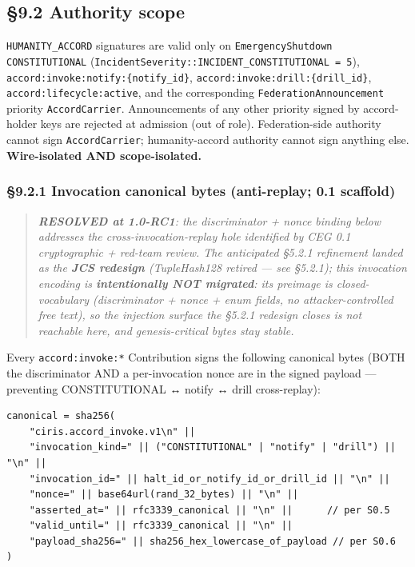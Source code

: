 \documentclass[11pt]{article}
\begin{document}
\subsection*{§9.2 Authority scope}


\texttt{HUMANITY\_ACCORD} signatures are valid only on \texttt{EmergencyShutdown CONSTITUTIONAL} (\texttt{IncidentSeverity::INCIDENT\_CONSTITUTIONAL = 5}), \texttt{accord:invoke:notify:\{notify\_id\}}, \texttt{accord:invoke:drill:\{drill\_id\}}, \texttt{accord:lifecycle:active}, and the corresponding \texttt{FederationAnnouncement} priority \texttt{AccordCarrier}. Announcements of any other priority signed by accord-holder keys are rejected at admission (out of role). Federation-side authority cannot sign \texttt{AccordCarrier}; humanity-accord authority cannot sign anything else. \textbf{Wire-isolated AND scope-isolated.}


\subsubsection*{§9.2.1 Invocation canonical bytes (anti-replay; 0.1 scaffold)}


\begin{quote}\itshape \textbf{RESOLVED at 1.0-RC1}: the discriminator + nonce binding below addresses the cross-invocation-replay hole identified by CEG 0.1 cryptographic + red-team review. The anticipated §5.2.1 refinement landed as the \textbf{JCS redesign} (TupleHash128 retired — see §5.2.1); this invocation encoding is \textbf{intentionally NOT migrated}: its preimage is closed-vocabulary (discriminator + nonce + enum fields, no attacker-controlled free text), so the injection surface the §5.2.1 redesign closes is not reachable here, and genesis-critical bytes stay stable.\end{quote}


Every \texttt{accord:invoke:*} Contribution signs the following canonical bytes (BOTH the discriminator AND a per-invocation nonce are in the signed payload — preventing CONSTITUTIONAL ↔ notify ↔ drill cross-replay):


\begin{lstlisting}
canonical = sha256(
    "ciris.accord_invoke.v1\n" ||
    "invocation_kind=" || ("CONSTITUTIONAL" | "notify" | "drill") || "\n" ||
    "invocation_id=" || halt_id_or_notify_id_or_drill_id || "\n" ||
    "nonce=" || base64url(rand_32_bytes) || "\n" ||
    "asserted_at=" || rfc3339_canonical || "\n" ||      // per S0.5
    "valid_until=" || rfc3339_canonical || "\n" ||
    "payload_sha256=" || sha256_hex_lowercase_of_payload // per S0.6
)
\end{lstlisting}
\end{document}
